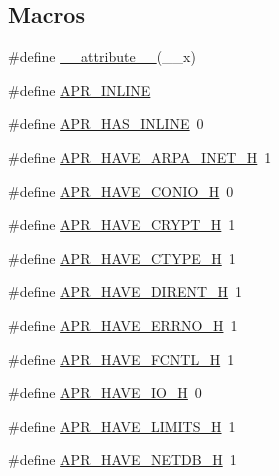\subsection*{Macros}
\begin{DoxyCompactItemize}
\item 
\#define \hyperlink{group__apr__platform_ga76a46571037bc82ff5ae544efcd5b3d1}{\+\_\+\+\_\+attribute\+\_\+\+\_\+}(\+\_\+\+\_\+x)
\item 
\#define \hyperlink{group__apr__platform_gaada0f3e7bf27ea51795c2c27c20aee84}{A\+P\+R\+\_\+\+I\+N\+L\+I\+NE}
\item 
\#define \hyperlink{group__apr__platform_ga1bfff486847c3fe487884bca79cb21fd}{A\+P\+R\+\_\+\+H\+A\+S\+\_\+\+I\+N\+L\+I\+NE}~0
\item 
\#define \hyperlink{group__apr__platform_gaa6740450eabc6384924801d569e89742}{A\+P\+R\+\_\+\+H\+A\+V\+E\+\_\+\+A\+R\+P\+A\+\_\+\+I\+N\+E\+T\+\_\+H}~1
\item 
\#define \hyperlink{group__apr__platform_ga24eb6d10ed0942ee4a4228df697fd5bb}{A\+P\+R\+\_\+\+H\+A\+V\+E\+\_\+\+C\+O\+N\+I\+O\+\_\+H}~0
\item 
\#define \hyperlink{group__apr__platform_ga38a75f33c3096b153d5302c0370e9e38}{A\+P\+R\+\_\+\+H\+A\+V\+E\+\_\+\+C\+R\+Y\+P\+T\+\_\+H}~1
\item 
\#define \hyperlink{group__apr__platform_gad0fe0c5bffd8073cb57178ceb9761933}{A\+P\+R\+\_\+\+H\+A\+V\+E\+\_\+\+C\+T\+Y\+P\+E\+\_\+H}~1
\item 
\#define \hyperlink{group__apr__platform_ga87b424528fd6448c5aabc6cc61024c9a}{A\+P\+R\+\_\+\+H\+A\+V\+E\+\_\+\+D\+I\+R\+E\+N\+T\+\_\+H}~1
\item 
\#define \hyperlink{group__apr__platform_gabb48338e636d4184f28d8fb08f449f6b}{A\+P\+R\+\_\+\+H\+A\+V\+E\+\_\+\+E\+R\+R\+N\+O\+\_\+H}~1
\item 
\#define \hyperlink{group__apr__platform_ga40e3ceafec2098262742573bb28797cf}{A\+P\+R\+\_\+\+H\+A\+V\+E\+\_\+\+F\+C\+N\+T\+L\+\_\+H}~1
\item 
\#define \hyperlink{group__apr__platform_ga2cf42c89ca9d5682dba7b12377342cc0}{A\+P\+R\+\_\+\+H\+A\+V\+E\+\_\+\+I\+O\+\_\+H}~0
\item 
\#define \hyperlink{group__apr__platform_ga449046121ca29eda9759cb2d30442e80}{A\+P\+R\+\_\+\+H\+A\+V\+E\+\_\+\+L\+I\+M\+I\+T\+S\+\_\+H}~1
\item 
\#define \hyperlink{group__apr__platform_gac92f65f1d27253f3af6d9714e4604550}{A\+P\+R\+\_\+\+H\+A\+V\+E\+\_\+\+N\+E\+T\+D\+B\+\_\+H}~1
\item 

\end{DoxyCompactItemize}

